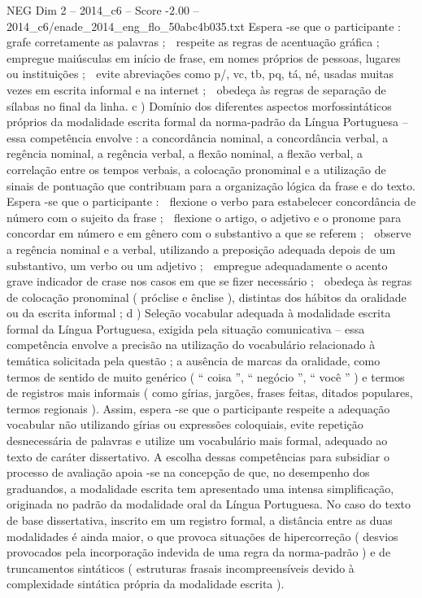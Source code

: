 \begin{textsample}{NEG Dim 2 – 2014\_c6 – Score -2.00 – 2014\_c6/enade\_2014\_eng\_flo\_50abc4b035.txt}
Espera -se que o participante :  grafe corretamente as palavras ;  respeite as regras de acentuação gráfica ;  empregue maiúsculas em início de frase, em nomes próprios de pessoas, lugares ou instituições ;  evite abreviações como p/, vc, tb, pq, tá, né, usadas muitas vezes em escrita informal e na internet ;  obedeça às regras de separação de sílabas no final da linha. c ) Domínio dos diferentes aspectos morfossintáticos próprios da modalidade escrita formal da norma-padrão da Língua Portuguesa – essa competência envolve : a concordância nominal, a concordância verbal, a regência nominal, a regência verbal, a flexão nominal, a flexão verbal, a correlação entre os tempos verbais, a colocação pronominal e a utilização de sinais de pontuação que contribuam para a organização lógica da frase e do texto.
Espera -se que o participante :  flexione o verbo para estabelecer concordância de número com o sujeito da frase ;  flexione o artigo, o adjetivo e o pronome para concordar em número e em gênero com o substantivo a que se referem ;  observe a regência nominal e a verbal, utilizando a preposição adequada depois de um substantivo, um verbo ou um adjetivo ;  empregue adequadamente o acento grave indicador de crase nos casos em que se fizer necessário ;  obedeça às regras de colocação pronominal ( próclise e ênclise ), distintas dos hábitos da oralidade ou da escrita informal ; d ) Seleção vocabular adequada à modalidade escrita formal da Língua Portuguesa, exigida pela situação comunicativa – essa competência envolve a precisão na utilização do vocabulário relacionado à temática solicitada pela questão ; a ausência de marcas da oralidade, como termos de sentido de muito genérico ( “ coisa ”, “ negócio ”, “ você ” ) e termos de registros mais informais ( como gírias, jargões, frases feitas, ditados populares, termos regionais ).
Assim, espera -se que o participante respeite a adequação vocabular não utilizando gírias ou expressões coloquiais, evite repetição desnecessária de palavras e utilize um vocabulário mais formal, adequado ao texto de caráter dissertativo.
A escolha dessas competências para subsidiar o processo de avaliação apoia -se na concepção de que, no desempenho dos graduandos, a modalidade escrita tem apresentado uma intensa simplificação, originada no padrão da modalidade oral da Língua Portuguesa.
No caso do texto de base dissertativa, inscrito em um registro formal, a distância entre as duas modalidades é ainda maior, o que provoca situações de hipercorreção ( desvios provocados pela incorporação indevida de uma regra da norma-padrão ) e de truncamentos sintáticos ( estruturas frasais incompreensíveis devido à complexidade sintática própria da modalidade escrita ).

\end{textsample}
